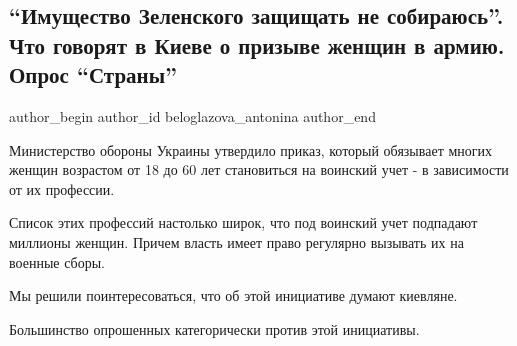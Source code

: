  
 
 
 
 
\subsection{\enquote{Имущество Зеленского защищать не собираюсь}. Что говорят в Киеве о призыве женщин в армию. Опрос \enquote{Страны}}
\label{sec:25_12_2021.stz.news.ua.strana.1.opros_prizyv_zhenschin}

\ifcmt
 author_begin
   author_id beloglazova_antonina
 author_end
\fi

Министерство обороны Украины утвердило приказ, который обязывает многих женщин
возрастом от 18 до 60 лет становиться на воинский учет - в зависимости от их
профессии.

Список этих профессий настолько широк, что под воинский учет подпадают миллионы
женщин. Причем власть имеет право регулярно вызывать их на военные сборы. 

Мы решили поинтересоваться, что об этой инициативе думают киевляне.

Большинство опрошенных категорически против этой инициативы. 

